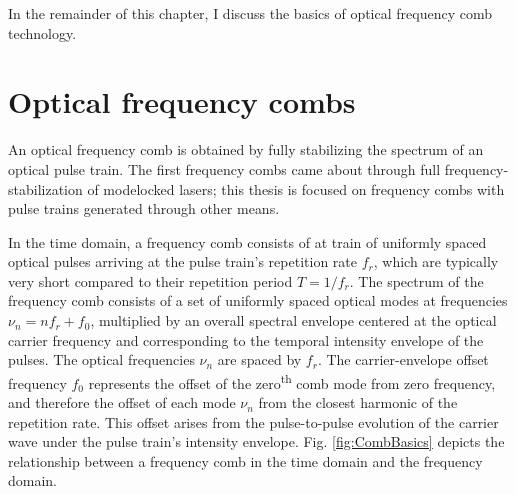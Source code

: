 In the remainder of this chapter, I discuss the basics of optical frequency comb technology.

\section{Optical frequency combs}

An optical frequency comb is obtained by fully stabilizing the spectrum of an optical pulse train. The first frequency combs came about through full frequency-stabilization of modelocked lasers; this thesis is focused on frequency combs with pulse trains generated through other means.

In the time domain, a frequency comb consists of at train of uniformly spaced optical pulses arriving at the pulse train's repetition rate $f_r$, which are typically very short compared to their repetition period $T=1/f_r$. The spectrum of the frequency comb consists of a set of uniformly spaced optical modes at frequencies $\nu_n=nf_r+f_0$, multiplied by an overall spectral envelope centered at the optical carrier frequency and corresponding to the temporal intensity envelope of the pulses. The optical frequencies $\nu_n$ are spaced by $f_r$. The carrier-envelope offset frequency $f_0$ represents the offset of the zero\textsuperscript{th} comb mode from zero frequency, and therefore the offset of each mode $\nu_n$ from the closest harmonic of the repetition rate. This offset arises from the pulse-to-pulse evolution of the carrier wave under the pulse train's intensity envelope. Fig. \ref{fig:CombBasics} depicts the relationship between a frequency comb in the time domain and the frequency domain.


